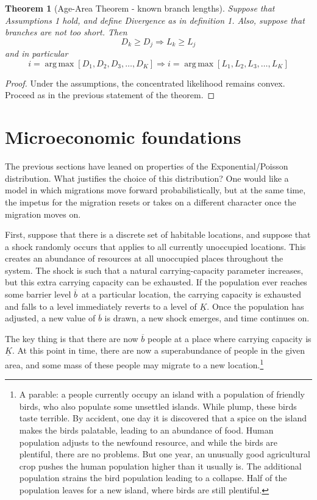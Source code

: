 \documentclass[11pt]{article}
\newtheorem{theorem}{Theorem}
\DeclareMathOperator*{\argmax}{arg\,max}
\begin{document}
\begin{theorem}[Age-Area Theorem  - known branch lengths]
Suppose that Assumptions 1 hold, and define Divergence as in definition 1. Also, suppose that branches are not too short.  Then  
\begin{equation*}
D_k \geq D_j \Longrightarrow L_k\geq L_j
\end{equation*}
and in particular
\begin{equation*}
i=\argmax\left[D_1,D_2,D_3,\hdots,D_{K}\right] \Longrightarrow i=\argmax\left[L_1,L_2,L_3,\hdots,L_K\right]
\end{equation*}
\end{theorem}

\begin{proof}
Under the assumptions, the concentrated likelihood remains convex. Proceed as in the previous statement of the theorem.
\end{proof}

\section{Microeconomic foundations}

The previous sections have leaned on properties of the Exponential/Poisson distribution. What justifies the choice of this distribution? One would like a model in which migrations move forward probabilistically, but at the same time, the impetus for the migration resets or takes on a different character once the migration moves on. 

First, suppose that there is a discrete set of habitable locations, and suppose that a shock randomly occurs that applies to all currently unoccupied locations. This creates an abundance of resources at all unoccupied places throughout the system. The shock is such that a natural carrying-capacity parameter increases, but this extra carrying capacity can be exhausted. If the population ever reaches some barrier level $\overline{b}$\ at a particular location, the carrying capacity is exhausted and falls to a level  immediately reverts to a level of $\underline{K}$. Once the population has adjusted, a new value of $\overline{b}$ is drawn, a new shock emerges, and time continues on. 

The key thing is that there are now $\overline{b}$ people at a place where carrying capacity is $\underline{K}$. At this point in time, there are now a superabundance of people in the given area, and some mass of these people may migrate to a new location.\footnote{A parable: a people currently occupy an island with a population of friendly birds, who also populate some unsettled islands. While plump, these birds taste terrible. By accident, one day it is discovered that a spice on the island makes the birds palatable, leading to an abundance of food. Human population adjusts to the newfound resource, and while the birds are plentiful, there are no problems. But one year, an unusually good agricultural crop pushes the human population higher than it usually is. The additional population strains the bird population leading to a collapse. Half of the population leaves for a new island, where birds are still plentiful.}
\end{document}
